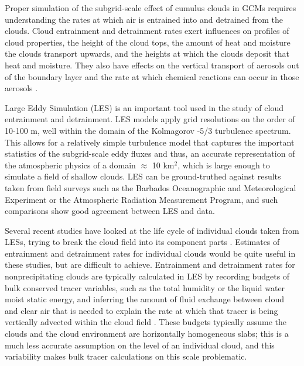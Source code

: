 \documentclass[12pt]{article}
\begin{document}
Proper simulation of the subgrid-scale effect of cumulus clouds in GCMs requires 
understanding the rates at which air is entrained into and detrained from the 
clouds. Cloud entrainment and detrainment rates exert influences on profiles of 
cloud properties, the height of the cloud tops, the amount of heat and moisture 
the clouds transport upwards, and the heights at which the clouds deposit that 
heat and moisture.  They also have effects on the vertical transport of 
aerosols out of the boundary layer and the rate at which chemical reactions can 
occur in those aerosols \citep{Barahona2007,Anldrejczuk2008}.

Large Eddy Simulation (LES) is an important tool used in the study of cloud 
entrainment and detrainment. LES models apply grid resolutions on the order 
of 10-100 m, well within the domain of the Kolmagorov -5/3 turbulence spectrum. 
This allows for a relatively simple turbulence model that captures the 
important statistics of the subgrid-scale eddy fluxes and thus, an accurate 
representation of the atmospheric physics of a domain $\approx$ 10 km$^{2}$, 
which is large enough to simulate a field of shallow clouds.  LES can be 
ground-truthed against results taken from field surveys such as the Barbados 
Oceanographic and Meteorological Experiment \citep[BOMEX;][]{Holland1973} or 
the Atmospheric Radiation Measurement \citep[ARM;][]{Brown2002} Program, and 
such comparisons show good agreement between LES and data.

Several recent studies have looked at the life cycle of individual clouds taken 
from LESs, trying to break the cloud field into its component parts 
\citep{Zhao2005,Zhao2005a,Heus2009}.  Estimates of entrainment and detrainment 
rates for individual clouds would be quite useful in these studies, but are 
difficult to achieve. Entrainment and detrainment rates for nonprecipitating 
clouds are typically calculated in LES by recording budgets of bulk conserved 
tracer variables, such as the total humidity or the liquid water moist static 
energy, and inferring the amount of fluid exchange between cloud and clear air 
that is needed to explain the rate at which that tracer is being vertically 
advected within the cloud field \citep{Siebesma1995}. These budgets typically 
assume the clouds and the cloud environment are horizontally homogeneous slabs; 
this is a much less accurate assumption on the level of an individual cloud, and 
this variability makes bulk tracer calculations on this scale problematic.
\end{document}
